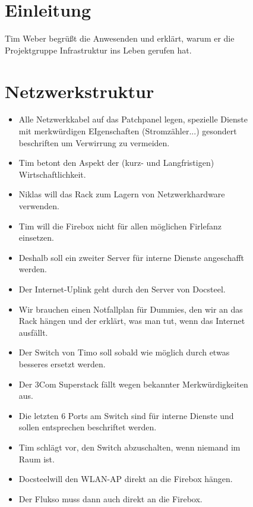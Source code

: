 \documentclass[parskip]{scrartcl}
\newcommand\docsteel{Docsteel}
\begin{document}
\tableofcontents

\begin{figure}
\section{Einleitung}

Tim Weber begrüßt die Anwesenden und erklärt, warum er die Projektgruppe Infrastruktur ins Leben gerufen hat.

\end{figure}
\begin{figure}
\section{Netzwerkstruktur}

\begin{itemize}

\item{} Alle Netzwerkkabel auf das Patchpanel legen, spezielle Dienste mit merkwürdigen EIgenschaften (Stromzähler...) gesondert beschriften
um Verwirrung zu vermeiden.

\item{} Tim betont den Aspekt der (kurz- und Langfristigen) Wirtschaftlichkeit.

\item{} Niklas will das Rack zum Lagern von Netzwerkhardware verwenden.

\item{} Tim will die Firebox nicht für allen möglichen Firlefanz einsetzen.
\item{} Deshalb soll ein zweiter Server für interne Dienste angeschafft werden.

\item{} Der Internet-Uplink geht durch den Server von \docsteel.

\item{} Wir brauchen einen Notfallplan für Dummies, den wir an das Rack hängen und der erklärt, was man tut, wenn
das Internet ausfällt.

\item{} Der Switch von Timo soll sobald wie möglich durch etwas besseres ersetzt werden.
\item{} Der 3Com Superstack fällt wegen bekannter Merkwürdigkeiten aus.
\item{} Die letzten 6 Ports am Switch sind für interne Dienste und sollen entsprechen beschriftet werden.

\item{} Tim schlägt vor, den Switch abzuschalten, wenn niemand im Raum ist.
\item{} \docsteel will den WLAN-AP direkt an die Firebox hängen.
\item{} Der Flukso muss dann auch direkt an die Firebox.


\end{itemize}
\end{figure}
\end{document}
